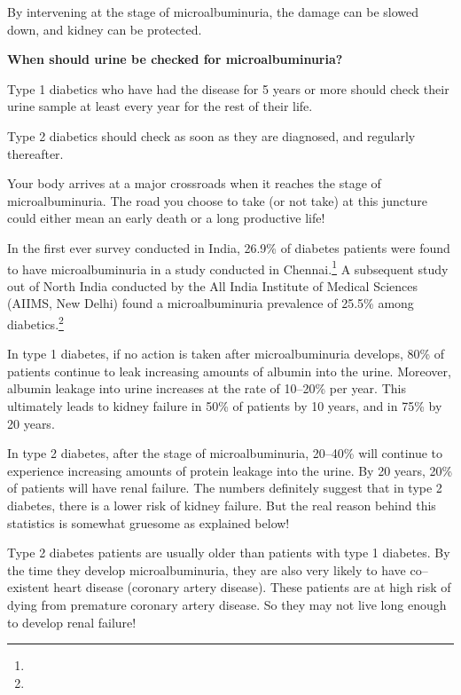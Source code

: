 {By intervening at the stage of microalbuminuria, the damage can be slowed down, and kidney can be protected.

\textbf{When should urine be checked for microalbuminuria?}

Type 1 diabetics who have had the disease for 5 years or more should check their urine sample at least every year for the rest of their life.

Type 2 diabetics should check as soon as they are diagnosed, and regularly thereafter.


Your body arrives at a major crossroads when it reaches the stage of microalbuminuria. The road you choose to take (or not take) at this juncture could either mean an early death or a long productive life!

In the first ever survey conducted in India, 26.9\% of diabetes patients were found to have microalbuminuria in a study conducted in Chennai.\footnote{} A subsequent study out of North India conducted by the All India Institute of Medical Sciences (AIIMS, New Delhi) found a microalbuminuria prevalence of 25.5\% among diabetics.\footnote{}

In type 1 diabetes, if no action is taken after microalbuminuria develops, 80\% of patients continue to leak increasing amounts of albumin into the urine. Moreover, albumin leakage into urine increases at the rate of 10–20\% per year. This ultimately leads to kidney failure in 50\% of patients by 10 years, and in 75\% by 20 years.

In type 2 diabetes, after the stage of microalbuminuria, 20–40\% will continue to experience increasing amounts of protein leakage into the urine. By 20 years, 20\% of patients will have renal failure. The numbers definitely suggest that in type 2 diabetes, there is a lower risk of kidney failure. But the real reason behind this statistics is somewhat gruesome as explained below!

Type 2 diabetes patients are usually older than patients with type 1 diabetes. By the time they develop microalbuminuria, they are also very likely to have co–existent heart disease (coronary artery disease). These patients are at high risk of dying from premature coronary artery disease. So they may not live long enough to develop renal failure!

}

